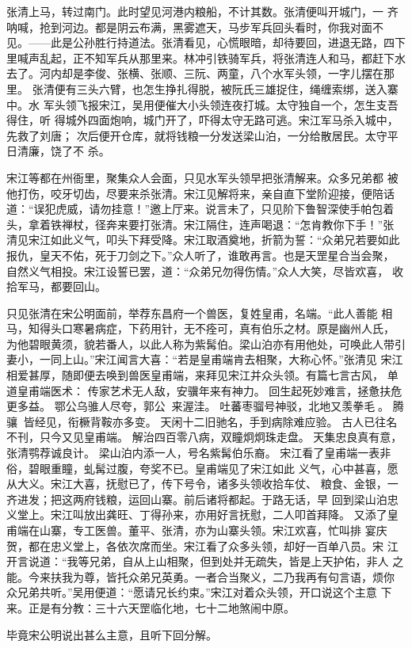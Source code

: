 张清上马，转过南门。此时望见河港内粮船，不计其数。张清便叫开城门，一
齐呐喊，抢到河边。都是阴云布满，黑雾遮天，马步军兵回头看时，你我对面不
见。——此是公孙胜行持道法。张清看见，心慌眼暗，却待要回，进退无路，四下
里喊声乱起，正不知军兵从那里来。林冲引铁骑军兵，将张清连人和马，都赶下水
去了。河内却是李俊、张横、张顺、三阮、两童，八个水军头领，一字儿摆在那里。
张清便有三头六臂，也怎生挣扎得脱，被阮氏三雄捉住，绳缠索绑，送入寨中。水
军头领飞报宋江，吴用便催大小头领连夜打城。太守独自一个，怎生支吾得住，听
得城外四面炮响，城门开了，吓得太守无路可逃。宋江军马杀入城中，先救了刘唐；
次后便开仓库，就将钱粮一分发送梁山泊，一分给散居民。太守平日清廉，饶了不
杀。

宋江等都在州衙里，聚集众人会面，只见水军头领早把张清解来。众多兄弟都
被他打伤，咬牙切齿，尽要来杀张清。宋江见解将来，亲自直下堂阶迎接，便陪话
道：“误犯虎威，请勿挂意！”邀上厅来。说言未了，只见阶下鲁智深使手帕包着
头，拿着铁禅杖，径奔来要打张清。宋江隔住，连声喝退：“怎肯教你下手！”张
清见宋江如此义气，叩头下拜受降。宋江取酒奠地，折箭为誓：“众弟兄若要如此
报仇，皇天不佑，死于刀剑之下。”众人听了，谁敢再言。也是天罡星合当会聚，
自然义气相投。宋江设誓已罢，道：“众弟兄勿得伤情。”众人大笑，尽皆欢喜，
收拾军马，都要回山。

只见张清在宋公明面前，举荐东昌府一个兽医，复姓皇甫，名端。“此人善能
相马，知得头口寒暑病症，下药用针，无不痊可，真有伯乐之材。原是幽州人氏，
为他碧眼黄须，貌若番人，以此人称为紫髯伯。梁山泊亦有用他处，可唤此人带引
妻小，一同上山。”宋江闻言大喜：“若是皇甫端肯去相聚，大称心怀。”张清见
宋江相爱甚厚，随即便去唤到兽医皇甫端，来拜见宋江并众头领。有篇七言古风，
单道皇甫端医术：
传家艺术无人敌，安骥年来有神力。
回生起死妙难言，拯惫扶危更多益。
鄂公乌骓人尽夸，郭公来渥洼。
吐蕃枣骝号神驳，北地又羡拳毛。
腾骧皆经见，衔橛背鞍亦多变。
天闲十二旧驰名，手到病除难应验。
古人已往名不刊，只今又见皇甫端。
解治四百零八病，双瞳炯炯珠走盘。
天集忠良真有意，张清鹗荐诚良计。
梁山泊内添一人，号名紫髯伯乐裔。
宋江看了皇甫端一表非俗，碧眼重瞳，虬髯过腹，夸奖不已。皇甫端见了宋江如此
义气，心中甚喜，愿从大义。宋江大喜，抚慰已了，传下号令，诸多头领收拾车仗、
粮食、金银，一齐进发；把这两府钱粮，运回山寨。前后诸将都起。于路无话，早
回到梁山泊忠义堂上。宋江叫放出龚旺、丁得孙来，亦用好言抚慰，二人叩首拜降。
又添了皇甫端在山寨，专工医兽。董平、张清，亦为山寨头领。宋江欢喜，忙叫排
宴庆贺，都在忠义堂上，各依次席而坐。宋江看了众多头领，却好一百单八员。宋
江开言说道：“我等兄弟，自从上山相聚，但到处并无疏失，皆是上天护佑，非人
之能。今来扶我为尊，皆托众弟兄英勇。一者合当聚义，二乃我再有句言语，烦你
众兄弟共听。”吴用便道：“愿请兄长约束。”宋江对着众头领，开口说这个主意
下来。正是有分教：三十六天罡临化地，七十二地煞闹中原。

毕竟宋公明说出甚么主意，且听下回分解。
